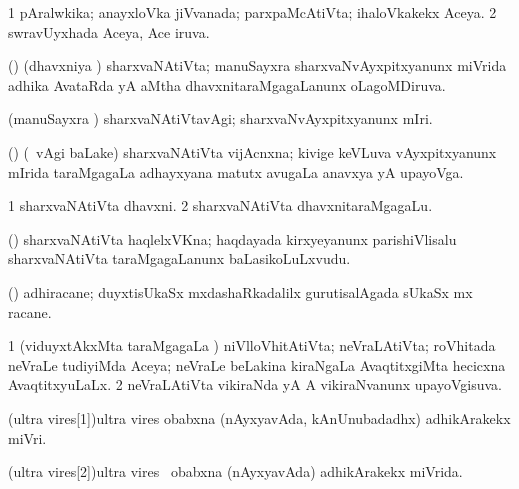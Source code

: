 {\bentry
{} 
\gl{\gu}
\expl{}
\bmng
\bnum
\num{1} pAralwkika; anayxloVka jiVvanada; parxpaMcAtiVta; ihaloVkakekx Aceya. 
\num{2} swravUyxhada Aceya, Ace iruva. 
\enum
\emng
\eentry

\bentry
{} 
\gl{\gu}
\expl{}
\bmng
(\Bwvi) (dhavxniya \vi) sharxvaNAtiVta; manuSayxra sharxvaNvAyxpitxyanunx miVrida adhika AvataRda yA aMtha dhavxnitaraMgagaLanunx oLagoMDiruva. 
\emng
\eentry

\bentry
{} 
\gl{\kirxvi}
\expl{}
\bmng
(manuSayxra \vi) sharxvaNAtiVtavAgi; sharxvaNvAyxpitxyanunx mIri. 
\emng
\eentry

\bentry
{} 
\gl{\nA}
\expl{}
\bmng
(\bava) (\sA\ \Eva vAgi baLake) sharxvaNAtiVta vijAcnxna; kivige keVLuva vAyxpitxyanunx mIrida taraMgagaLa adhayxyana matutx avugaLa anavxya yA upayoVga. 
\emng
\eentry

\bentry
{} 
\gl{\nA}
\expl{}
\bmng
\bnum
\num{1} sharxvaNAtiVta dhavxni. 
\num{2} sharxvaNAtiVta dhavxnitaraMgagaLu. 
\enum
\emng
\eentry

\bentry
{}
\gl{\nA}
\expl{}
\bmng
(\veYshA) sharxvaNAtiVta haqlelxVKna; haqdayada kirxyeyanunx parishiVlisalu sharxvaNAtiVta taraMgagaLanunx baLasikoLuLxvudu. 
\emng
\eentry

\bentry
{} 
\gl{\nA}
\expl{}
\bmng
(\jiVvi) adhiracane; duyxtisUkaSx mxdashaRkadalilx  gurutisalAgada sUkaSx mx racane. 
\emng
\eentry

\bentry
{} 
\gl{\gu}
\expl{}
\bmng
\bnum
\num{1} (viduyxtAkxMta taraMgagaLa \vi) niVlloVhitAtiVta; neVraLAtiVta; roVhitada neVraLe tudiyiMda Aceya; neVraLe beLakina kiraNgaLa AvaqtitxgiMta hecicxna AvaqtitxyuLaLx. 
\num{2} neVraLAtiVta vikiraNda yA A vikiraNvanunx upayoVgisuva. 
\enum
\emng
\eentry

\bentry
\wordf(ultra vires[1]){ultra vires} 
\gl{\kirxvi}
\expl{\Latin}
\bmng
obabxna (nAyxyavAda, kAnUnubadadhx) adhikArakekx miVri. 
\emng
\eentry

\bentry
\wordf(ultra vires[2]){ultra vires} 
\gl{\gu}
\expl{\Latin}
\bmng
\kanu\ obabxna (nAyxyavAda) adhikArakekx miVrida. 
\emng
\eentry

}
